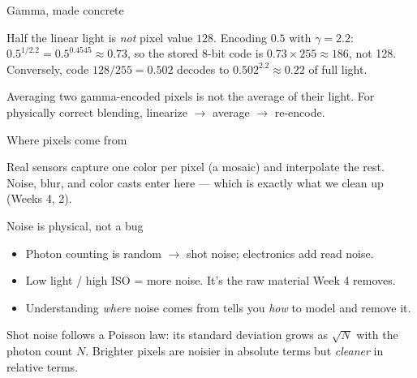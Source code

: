 \documentclass[10pt,aspectratio=169]{beamer}
\begin{document}
\begin{frame}{Gamma, made concrete}
  \begin{mathbox}
    Half the linear light is \emph{not} pixel value \(128\). Encoding \(0.5\) with \(\gamma = 2.2\): \\[3pt]
    \(0.5^{1/2.2} = 0.5^{0.4545} \approx 0.73\), so the stored 8-bit code is \(0.73 \times 255 \approx 186\), not 128. \\[3pt]
    Conversely, code \(128/255 = 0.502\) decodes to \(0.502^{2.2} \approx 0.22\) of full light.
  \end{mathbox}
  \begin{badbox}
    Averaging two gamma-encoded pixels is not the average of their light. For physically
    correct blending, linearize $\rightarrow$ average $\rightarrow$ re-encode.
  \end{badbox}
\end{frame}

\begin{frame}{Where pixels come from}
  \begin{center}
  \end{center}
  Real sensors capture one color per pixel (a  mosaic) and interpolate the rest.
  Noise, blur, and color casts enter here — which is exactly what we clean up (Weeks 4, 2).
\end{frame}

\begin{frame}{Noise is physical, not a bug}
  \begin{itemize}
    \item Photon counting is random $\rightarrow$ shot noise; electronics add read noise.
    \item Low light / high ISO = more noise. It's the raw material Week 4 removes.
    \item Understanding \emph{where} noise comes from tells you \emph{how} to model and remove it.
  \end{itemize}
  \begin{infobox}
    Shot noise follows a Poisson law: its standard deviation grows as \(\sqrt{N}\) with the photon
    count \(N\). Brighter pixels are noisier in absolute terms but \emph{cleaner} in relative terms.
  \end{infobox}
\end{frame}
\end{document}
